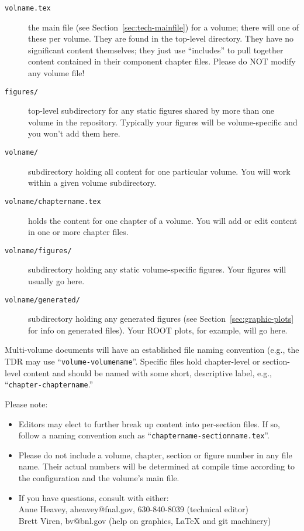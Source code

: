 \begin{description}
\item[\texttt{volname.tex}] the main file (see Section~\ref{sec:tech-mainfile}) for a volume; there will one of these per volume. They are found in the top-level
  directory. They have no significant content themselves; they just use
  ``includes'' to pull together content contained in their component chapter files. Please do NOT modify any volume file!
\item[\texttt{figures/}] top-level subdirectory for any static figures
  shared by more than one volume in the repository. Typically your figures will be volume-specific and you won't add them here.
\item[\texttt{volname/}] subdirectory holding all content for one particular volume. You will work within a given volume subdirectory.
\item[\texttt{volname/chaptername.tex}] holds the content for one chapter of a volume. You will add or edit content in one or more chapter files.
\item[\texttt{volname/figures/}] subdirectory holding any static volume-specific figures. Your figures will usually go here.
\item[\texttt{volname/generated/}] subdirectory holding any generated
  figures (see Section~\ref{sec:graphic-plots} for info on generated files). Your ROOT plots, for example, will go here.
\end{description}

Multi-volume documents will have an established file naming convention (e.g., the
TDR may use ``\texttt{volume-volumename}''.
Specific files hold chapter-level or section-level content and should be named with some
short, descriptive label, e.g., ``\texttt{chapter-chaptername}.''

Please note:
\begin{itemize}
\item Editors may elect to further break up content into per-section files. If so, follow a naming convention such as ``\texttt{chaptername-sectionname.tex}''.
\item Please do not include a volume, chapter, section or figure number in any file name. Their actual numbers will be determined at compile time according to the configuration and the volume's main file. 
\item If you have questions, consult with either: \\
  Anne Heavey, aheavey@fnal.gov, 630-840-8039 (technical editor)\\
  Brett Viren, bv@bnl.gov (help on graphics, \LaTeX{} and git machinery)
\end{itemize}



